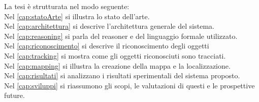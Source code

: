 \noindent
La tesi è strutturata nel modo seguente: \\
Nel \autoref{cap:statoArte} si illustra lo stato dell'arte. \\ 
Nel \autoref{cap:architettura} si descrive l'architettura generale del sistema. \\
Nel \autoref{cap:reasoning} si parla del reasoner e del linguaggio formale utilizzato. \\
Nel \autoref{cap:riconoscimento} si descrive il riconoscimento degli oggetti \\
Nel \autoref{cap:tracking} si mostra come gli oggetti riconosciuti sono tracciati. \\
Nel \autoref{cap:mapping} si illustra la creazione della mappa e la localizzazione. \\
Nel \autoref{cap:risultati} si analizzano i risultati sperimentali del sistema proposto. \\
Nel \autoref{cap:sviluppi} si riassumono gli scopi, le valutazioni di questi e le prospettive future. 

